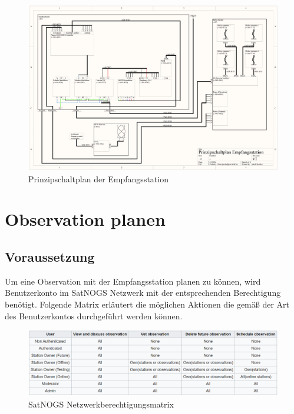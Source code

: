 \begin{landscape}
	\begin{figure}
		\centering
		\includegraphics[width=\linewidth]{../ref/Prinzipschaltplan.jpg}
		\caption{Prinzipschaltplan der Empfangsstation}
		\label{fig:prinzipschaltplan}
	\end{figure}
\end{landscape}

\section{Observation planen}
\subsection{Voraussetzung}
Um eine Observation mit der Empfangsstation planen zu können, wird Benutzerkonto im SatNOGS Netzwerk mit der entsprechenden Berechtigung benötigt. Folgende Matrix erläutert die möglichen Aktionen die gemäß der Art des Benutzerkontos durchgeführt werden können.

\begin{figure} [H]
	\centering
	\includegraphics[width=\linewidth]{../ref/network_permission_matrix.png}
	\caption{SatNOGS Netzwerkberechtigungsmatrix \cite{noauthor_operation_nodate}}
	\label{fig:networkpermissionmatrix}
\end{figure}

